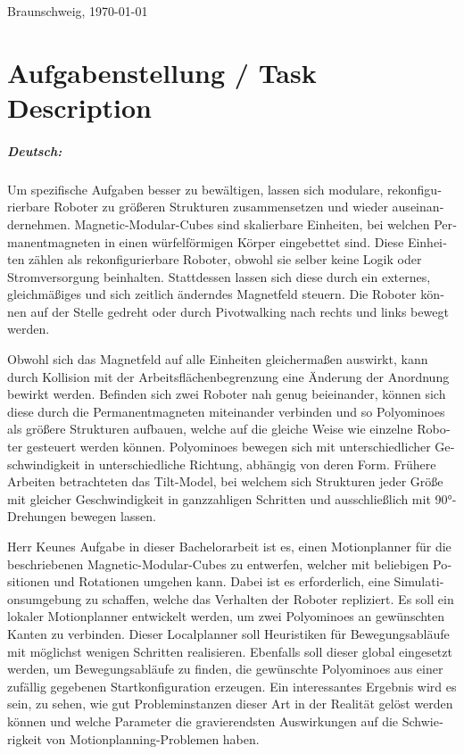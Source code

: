 \documentclass[11pt,a4paper,twoside,titlepage]{scrbook}
\theoremstyle{definition}
\begin{document}
	\par
	\bigskip\noindent Braunschweig, \today \par
	\vspace*{10mm}
	\hfill\hrulefill
	\clearpage
	
	
	\chapter*{Aufgabenstellung / Task Description}


\paragraph{Deutsch:}
\begin{otherlanguage}{ngerman}
	Um spezifische Aufgaben besser zu bewältigen, lassen sich modulare, rekonfigurierbare Roboter zu größeren Strukturen zusammensetzen und wieder auseinandernehmen.
	Magnetic-Modular-Cubes sind skalierbare Einheiten, bei welchen Permanentmagneten in einen würfelförmigen Körper eingebettet sind.
	Diese Einheiten zählen als rekonfigurierbare Roboter, obwohl sie selber keine Logik oder Stromversorgung beinhalten.
	Stattdessen lassen sich diese durch ein externes, gleichmäßiges und sich zeitlich änderndes Magnetfeld steuern.
	Die Roboter können auf der Stelle gedreht oder durch Pivotwalking nach rechts und links bewegt werden.
	
	Obwohl sich das Magnetfeld auf alle Einheiten gleichermaßen auswirkt, kann durch Kollision mit der Arbeitsflächenbegrenzung eine Änderung der Anordnung bewirkt werden.
	Befinden sich zwei Roboter nah genug beieinander, können sich diese durch die Permanentmagneten miteinander verbinden und so Polyominoes als größere Strukturen aufbauen, welche auf die gleiche Weise wie einzelne Roboter gesteuert werden können.
	Polyominoes bewegen sich mit unterschiedlicher Geschwindigkeit in unterschiedliche Richtung, abhängig von deren Form.
	Frühere Arbeiten betrachteten das Tilt-Model, bei welchem sich Strukturen jeder Größe mit gleicher Geschwindigkeit in ganzzahligen Schritten und ausschließlich mit 90°-Drehungen bewegen lassen.
	
	Herr Keunes Aufgabe in dieser Bachelorarbeit ist es, einen Motionplanner für die beschriebenen Magnetic-Modular-Cubes zu entwerfen, welcher mit beliebigen Positionen und Rotationen umgehen kann.
	Dabei ist es erforderlich, eine Simulationsumgebung zu schaffen, welche das Verhalten der Roboter repliziert.
	Es soll ein lokaler Motionplanner entwickelt werden, um zwei Polyominoes an gewünschten Kanten zu verbinden.
	Dieser Localplanner soll Heuristiken für Bewegungsabläufe mit möglichst wenigen Schritten realisieren.
	Ebenfalls soll dieser global eingesetzt werden, um Bewegungsabläufe zu finden, die gewünschte Polyominoes aus einer zufällig gegebenen Startkonfiguration erzeugen.
	Ein interessantes Ergebnis wird es sein, zu sehen, wie gut Probleminstanzen dieser Art in der Realität gelöst werden können und welche Parameter die gravierendsten Auswirkungen auf die Schwierigkeit von Motionplanning-Problemen haben.
	
\end{otherlanguage}
\end{document}
